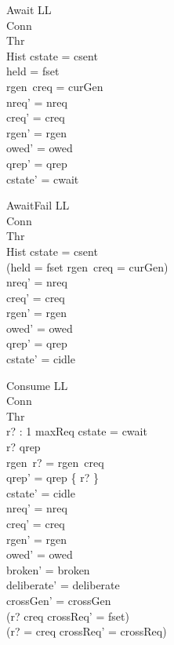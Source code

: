 \documentclass[a4paper,10pt,fleqn]{article}
\begin{document}
\begin{schema}{Await}
  \Delta LL \\
  \Xi Conn \\
  \Xi Thr \\
  \Xi Hist
\where
  cstate = csent \\
  held = fset \\
  rgen~creq = curGen \\
  nreq' = nreq \\
  creq' = creq \\
  rgen' = rgen \\
  owed' = owed \\
  qrep' = qrep \\
  cstate' = cwait
\end{schema}

\begin{schema}{AwaitFail}
  \Delta LL \\
  \Xi Conn \\
  \Xi Thr \\
  \Xi Hist
\where
  cstate = csent \\
  \lnot (held = fset \land rgen~creq = curGen) \\
  nreq' = nreq \\
  creq' = creq \\
  rgen' = rgen \\
  owed' = owed \\
  qrep' = qrep \\
  cstate' = cidle
\end{schema}

\begin{schema}{Consume}
  \Delta LL \\
  \Xi Conn \\
  \Xi Thr \\
  r? : 1 \upto maxReq
\where
  cstate = cwait \\
  r? \in qrep \\
  rgen~r? = rgen~creq \\
  qrep' = qrep \setminus \{ r? \} \\
  cstate' = cidle \\
  nreq' = nreq \\
  creq' = creq \\
  rgen' = rgen \\
  owed' = owed \\
  broken' = broken \\
  deliberate' = deliberate \\
  crossGen' = crossGen \\
  (r? \neq creq \implies crossReq' = fset) \\
  (r? = creq \implies crossReq' = crossReq)
\end{schema}
\end{document}
